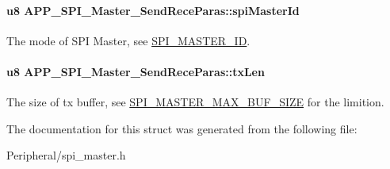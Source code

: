 \paragraph[{\texorpdfstring{spi\+Master\+Id}{spiMasterId}}]{\setlength{\rightskip}{0pt plus 5cm}u8 A\+P\+P\+\_\+\+S\+P\+I\+\_\+\+Master\+\_\+\+Send\+Rece\+Paras\+::spi\+Master\+Id}\hypertarget{struct_a_p_p___s_p_i___master___send_rece_paras_a0dbaca828a31446c91c8cb32bdf9ddc1}{}\label{struct_a_p_p___s_p_i___master___send_rece_paras_a0dbaca828a31446c91c8cb32bdf9ddc1}
The mode of S\+PI Master, see \hyperlink{group___s_p_i___m_a_s_t_e_r___i_d}{S\+P\+I\+\_\+\+M\+A\+S\+T\+E\+R\+\_\+\+ID}. 
\paragraph[{\texorpdfstring{tx\+Len}{txLen}}]{\setlength{\rightskip}{0pt plus 5cm}u8 A\+P\+P\+\_\+\+S\+P\+I\+\_\+\+Master\+\_\+\+Send\+Rece\+Paras\+::tx\+Len}\hypertarget{struct_a_p_p___s_p_i___master___send_rece_paras_a5fc24315bb20c17b9afe30da64cf882e}{}\label{struct_a_p_p___s_p_i___master___send_rece_paras_a5fc24315bb20c17b9afe30da64cf882e}
The size of tx buffer, see \hyperlink{group___s_p_i___m_a_s_t_e_r___m_a_x___b_u_f___s_i_z_e}{S\+P\+I\+\_\+\+M\+A\+S\+T\+E\+R\+\_\+\+M\+A\+X\+\_\+\+B\+U\+F\+\_\+\+S\+I\+ZE} for the limition. 

The documentation for this struct was generated from the following file\+:\begin{DoxyCompactItemize}
\item 
Peripheral/spi\+\_\+master.\+h\end{DoxyCompactItemize}
